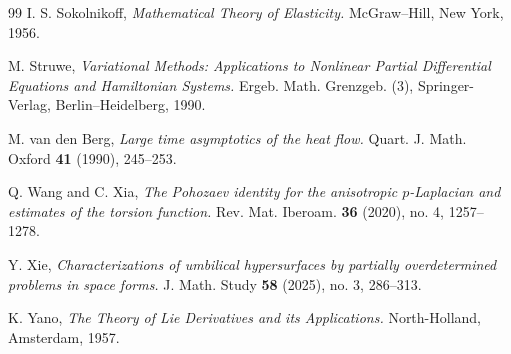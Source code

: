 \documentclass[reqno,11pt]{amsart}
\numberwithin{equation}{section}  %
\begin{document}
\begin{thebibliography}{99}
I. S. Sokolnikoff,
\emph{Mathematical Theory of Elasticity.}
McGraw--Hill, New York, 1956.

M. Struwe,
\emph{Variational Methods: Applications to Nonlinear Partial Differential Equations and Hamiltonian Systems.}
Ergeb. Math. Grenzgeb. (3), Springer-Verlag, Berlin--Heidelberg, 1990.

M. van den Berg,
\emph{Large time asymptotics of the heat flow.}
Quart. J. Math. Oxford {\bf 41} (1990), 245--253.

Q. Wang and C. Xia,
\emph{The Pohozaev identity for the anisotropic $p$-Laplacian and estimates of the torsion function.}
Rev. Mat. Iberoam. {\bf 36} (2020), no. 4, 1257--1278.

Y. Xie,
\emph{Characterizations of umbilical hypersurfaces by partially overdetermined problems in space forms.}
J. Math. Study {\bf 58} (2025), no. 3, 286--313.

K. Yano,
\emph{The Theory of Lie Derivatives and its Applications.}
North-Holland, Amsterdam, 1957.

\end{thebibliography}
\end{document}
